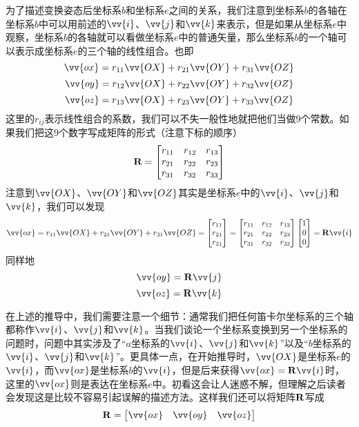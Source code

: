 \documentclass[11pt]{article}
\begin{document}
为了描述变换姿态后坐标系$b$和坐标系$e$之间的关系，我们注意到坐标系$b$的各轴在坐标系$b$中可以用前述的$\vv{i}$、$\vv{j}$和$\vv{k}$来表示，但是如果从坐标系$e$中观察，坐标系$b$的各轴就可以看做坐标系$e$中的普通矢量，那么坐标系$b$的一个轴可以表示成坐标系$e$的三个轴的线性组合。也即
$$
\vv{ox} = r_{11}\vv{OX} + r_{21}\vv{OY} + r_{31}\vv{OZ} 
$$
$$
\vv{oy} = r_{12}\vv{OX} + r_{22}\vv{OY} + r_{32}\vv{OZ} 
$$
$$
\vv{oz} = r_{13}\vv{OX} + r_{23}\vv{OY} + r_{33}\vv{OZ} 
$$
这里的$r_{ij}$表示线性组合的系数，我们可以不失一般性地就把他们当做9个常数。如果我们把这9个数字写成矩阵的形式（注意下标的顺序）
$$
{\bf R} = \begin{bmatrix}
r_{11} & r_{12} & r_{13}\\
r_{21} & r_{22} & r_{23}\\
r_{31} & r_{32} & r_{33}
\end{bmatrix}
$$
注意到$\vv{OX}$、$\vv{OY}$和$\vv{OZ}$其实是坐标系$e$中的$\vv{i}$、$\vv{j}$和$\vv{k}$，我们可以发现
$$
\vv{ox} = r_{11}\vv{OX} + r_{21}\vv{OY} + r_{31}\vv{OZ}  = 
\begin{bmatrix}
r_{11}\\
r_{21}\\
r_{31}
\end{bmatrix} =
\begin{bmatrix}
r_{11} & r_{12} & r_{13}\\
r_{21} & r_{22} & r_{23}\\
r_{31} & r_{32} & r_{33}
\end{bmatrix}
\begin{bmatrix}
1\\
0\\
0
\end{bmatrix} = {\bf R} \vv{i}
$$
同样地
$$
\vv{oy} =   {\bf R} \vv{j}
$$
$$
\vv{oz} =   {\bf R} \vv{k}
$$

在上述的推导中，我们需要注意一个细节：通常我们把任何笛卡尔坐标系的三个轴都称作$\vv{i}$、$\vv{j}$和$\vv{k}$。当我们谈论一个坐标系变换到另一个坐标系的问题时，问题中其实涉及了“$a$坐标系的$\vv{i}$、$\vv{j}$和$\vv{k}$”以及“$b$坐标系的$\vv{i}$、$\vv{j}$和$\vv{k}$”。更具体一点，在开始推导时，$\vv{OX}$是坐标系$e$的$\vv{i}$，而$\vv{ox}$是坐标系$b$的$\vv{i}$，但是后来获得$\vv{ox} =   {\bf R} \vv{i}$时，这里的$\vv{ox}$则是表达在坐标系$e$中。初看这会让人迷惑不解，但理解之后读者会发现这是比较不容易引起误解的描述方法。这样我们还可以将矩阵${\bf R}$写成
$$
{\bf R} = \begin{bmatrix}
\vv{ox} & \vv{oy} & \vv{oz}\\
\end{bmatrix}
$$
\end{document}
